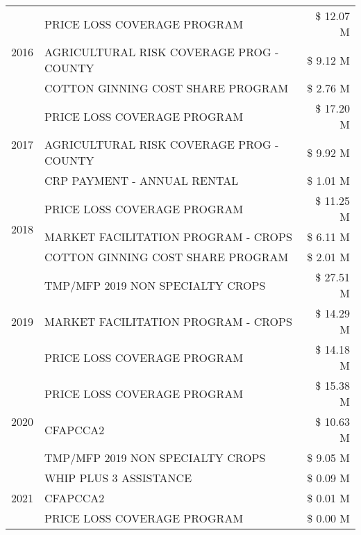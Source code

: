 \begin{tabular}{llr}
\multirow[t]{3}{*}{2016} & PRICE LOSS COVERAGE PROGRAM & \$ 12.07 M \\
 & AGRICULTURAL RISK COVERAGE PROG - COUNTY & \$ 9.12 M \\
 & COTTON GINNING COST SHARE PROGRAM & \$ 2.76 M \\
\cline{1-3}
\multirow[t]{3}{*}{2017} & PRICE LOSS COVERAGE PROGRAM & \$ 17.20 M \\
 & AGRICULTURAL RISK COVERAGE PROG - COUNTY & \$ 9.92 M \\
 & CRP PAYMENT - ANNUAL RENTAL & \$ 1.01 M \\
\cline{1-3}
\multirow[t]{3}{*}{2018} & PRICE LOSS COVERAGE PROGRAM & \$ 11.25 M \\
 & MARKET FACILITATION PROGRAM - CROPS & \$ 6.11 M \\
 & COTTON GINNING COST SHARE PROGRAM & \$ 2.01 M \\
\cline{1-3}
\multirow[t]{3}{*}{2019} & TMP/MFP 2019 NON SPECIALTY CROPS & \$ 27.51 M \\
 & MARKET FACILITATION PROGRAM - CROPS & \$ 14.29 M \\
 & PRICE LOSS COVERAGE PROGRAM & \$ 14.18 M \\
\cline{1-3}
\multirow[t]{3}{*}{2020} & PRICE LOSS COVERAGE PROGRAM & \$ 15.38 M \\
 & CFAPCCA2 & \$ 10.63 M \\
 & TMP/MFP 2019 NON SPECIALTY CROPS & \$ 9.05 M \\
\cline{1-3}
\multirow[t]{3}{*}{2021} & WHIP PLUS 3 ASSISTANCE & \$ 0.09 M \\
 & CFAPCCA2 & \$ 0.01 M \\
 & PRICE LOSS COVERAGE PROGRAM & \$ 0.00 M \\
\cline{1-3}
\bottomrule
\end{tabular}
